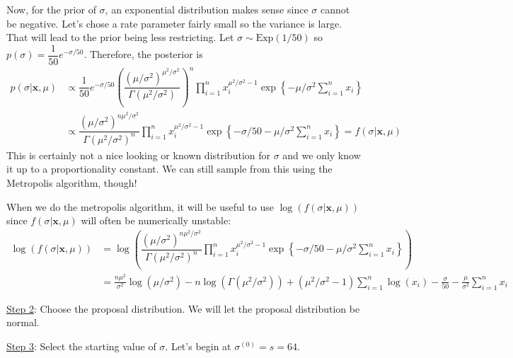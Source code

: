 \documentclass[11pt]{article}
\begin{document}
Now, for the prior of $\sigma$, an exponential distribution makes sense since $\sigma$ cannot be negative. Let's chose a rate parameter fairly small so the variance is large. That will lead to the prior being less restricting. Let $\sigma\sim \text{Exp}(1/50)$ so $p(\sigma)=\dfrac{1}{50}e^{-\sigma/50}$. Therefore, the posterior is 
\begin{align*}
p(\sigma|\boldsymbol{x},\mu)&\propto  \dfrac{1}{50}e^{-\sigma/50}\left(\dfrac{(\mu/\sigma^2)^{\mu^2/\sigma^2}}{\Gamma(\mu^2/\sigma^2)}\right)^n\prod_{i=1}^nx_i^{\mu^2/\sigma^2-1}\exp\left\{-\mu/\sigma^2\sum_{i=1}^nx_i\right\}\\
&\propto\dfrac{(\mu/\sigma^2)^{n\mu^2/\sigma^2}}{\Gamma(\mu^2/\sigma^2)^n}\prod_{i=1}^nx_i^{\mu^2/\sigma^2-1}\exp\left\{-\sigma/50-\mu/\sigma^2\sum_{i=1}^nx_i\right\}= f(\sigma|\boldsymbol{x},\mu)
\end{align*}
This is certainly not a nice looking or known distribution for $\sigma$ and we only know it up to a proportionality constant. We can still sample from this using the Metropolis algorithm, though!

When we do the metropolis algorithm, it will be useful to use $\log(f(\sigma|\boldsymbol{x},\mu))$ since $f(\sigma|\boldsymbol{x},\mu)$ will often be numerically unstable:
\begin{align*}
\log\left(f(\sigma|\boldsymbol{x},\mu)\right)&=\log\left(\dfrac{(\mu/\sigma^2)^{n\mu^2/\sigma^2}}{\Gamma(\mu^2/\sigma^2)^n}\prod_{i=1}^nx_i^{\mu^2/\sigma^2-1}\exp\left\{-\sigma/50-\mu/\sigma^2\sum_{i=1}^nx_i\right\}\right)\\
&=\frac{n\mu^2}{\sigma^2}\log(\mu/\sigma^2)-n\log\left(\Gamma(\mu^2/\sigma^2)\right)+(\mu^2/\sigma^2-1)\sum_{i=1}^n\log(x_i)-\frac{\sigma}{50}-\frac{\mu}{\sigma^2}\sum_{i=1}^nx_i
\end{align*}

\newpage

\uline{Step 2}: Choose the proposal distribution. We will let the proposal distribution be normal.\newline

\vspace{-.2in}

\uline{Step 3}: Select the starting value of $\sigma$. Let's begin at $\sigma^{(0)}=s=64$. 
\end{document}
